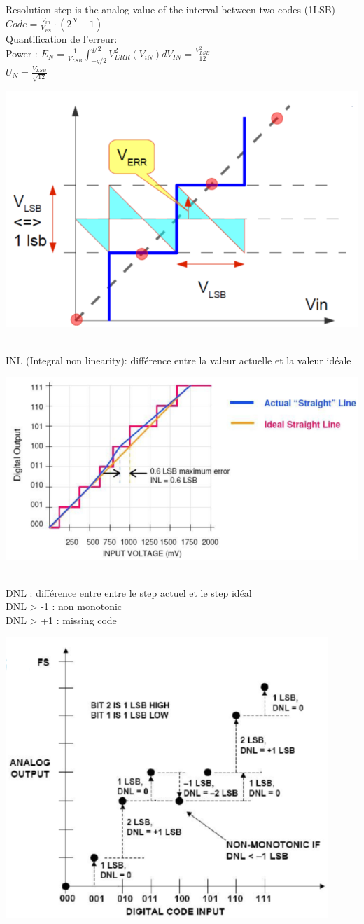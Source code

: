 \documentclass[resume]{subfiles}
\begin{document}
\begin{multicols}{3}
Resolution step is the analog value of the interval between two codes (1LSB)\\
$Code =\frac{V_{in}}{V_{FS}}\cdot (2^N-1)$\\
Quantification de l'erreur:\\
Power : $E_N=\frac{1}{V_{LSB}}\int_{-q/2}^{q/2}V_{ERR}^2(V_{iN})dV_{IN}=\frac{V_{LSB}^2}{12}$\\
$U_N=\frac{V_{LSB}}{\sqrt{12}}$\\
\begin{minipage}{\linewidth}
	\centering
    \includegraphics[width =0.7\columnwidth]{an1.png}
\end{minipage}\\
INL (Integral non linearity): différence entre la valeur actuelle et la valeur idéale\\
\begin{minipage}{\linewidth}
	\centering
    \includegraphics[width =0.7\columnwidth]{an2.png}
\end{minipage}\\
DNL : différence entre entre le step actuel et le step idéal\\
DNL > -1 : non monotonic\\
DNL > +1 : missing code\\
\begin{minipage}{\linewidth}
	\centering
    \includegraphics[width =0.7\columnwidth]{an3.png}

\end{minipage}
\end{multicols}
\end{document}
